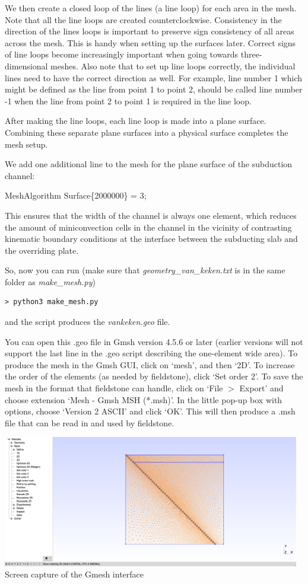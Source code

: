 We then create a closed loop of the lines (a line loop) for each area in the mesh. Note that all the line loops are created counterclockwise. Consistency in the direction of the lines loops is important to preserve sign consistency of all areas across the mesh. This is handy when setting up the surfaces later. Correct signs of line loops become increasingly important when going towards three-dimensional meshes. Also note that to set up line loops correctly, the individual lines need to have the correct direction as well. For example, line number 1 which might be defined as the line from point 1 to point 2, should be called line number -1 when the line from point 2 to point 1 is required in the line loop. 

After making the line loops, each line loop is made into a plane surface. Combining these separate plane surfaces into a physical surface completes the mesh setup. 

We add one additional line to the mesh for the plane surface of the subduction channel:

MeshAlgorithm Surface\{2000000\} = 3;

This ensures that the width of the channel is always one element, which reduces the amount of miniconvection cells in the channel in the vicinity of contrasting kinematic boundary conditions at the interface between the subducting slab and the overriding plate. 

So, now you can run
(make sure that {\sl geometry\_van\_keken.txt} is in the same folder as {\sl make\_mesh.py})
\begin{verbatim}
> python3 make_mesh.py
\end{verbatim}
and the script produces the {\sl vankeken.geo} file. 

You can open this .geo file in Gmsh version 4.5.6 or later (earlier versions will not support the 
last line in the .geo script describing the one-element wide area). To produce the mesh in 
the Gmsh GUI, click on `mesh', and then `2D'. To increase the order of the 
elements (as needed by fieldstone), click `Set order 2'. To save the mesh in the 
format that fieldstone can handle, click on `File $>$ Export' and choose extension `Mesh - Gmsh MSH (*.msh)'. 
In the little pop-up box with options, choose `Version 2 ASCII' and click `OK'. This will then 
produce a .msh file that can be read in and used by fieldstone. 

\begin{center}
\includegraphics[width=13cm]{python_codes/fieldstone_68/images/gmsh}\\
{\captionfont Screen capture of the Gmesh interface}
\end{center}


